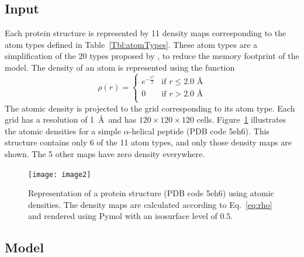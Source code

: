 \documentclass{bioinfo}
\begin{document}
\subsection{Input}

Each protein structure is represented by 11 density maps corresponding
to the atom types defined in Table~\ref{Tbl:atomTypes}. These atom
types are a simplification of the 20 types proposed by \citealp{huang2006iterative, huang2008iterative}, to reduce the
memory footprint of the model.
The density of an atom is represented using the function
\begin{equation}
\rho(r) =  \begin{cases}
               e^{-\frac{r^2}{2}}&\text{if } r\leq 2.0\text{ \AA} \\
               0                 &\text{if } r>2.0\text{ \AA} \\
            \end{cases}
\label{eq:rho}
\end{equation}
The atomic density is projected to the grid corresponding to its atom
type. Each grid has a resolution of 1~\AA\ and has $120\times
120\times 120$ cells.
%
Figure~\ref{Fig:atomic_densities} illustrates the atomic densities for
a simple $\alpha$-helical peptide (PDB code 5eh6). This structure
contains only 6 of the 11 atom types, and only those density maps are
shown. The 5 other maps have zero density everywhere.

\begin{figure}[t]
    \centerline{\texttt{[image: image2]}}
%
    \vspace{-10pt}
    \caption{Representation of a protein structure (PDB code 5eh6)
    using atomic densities. The density maps are calculated according
    to Eq.~\ref{eq:rho} and rendered using Pymol \citep{PyMOL} with an
    isosurface level of $0.5$.}
%
    \label{Fig:atomic_densities}
\end{figure}


\subsection{Model}
\end{document}

